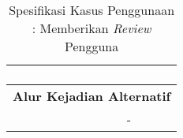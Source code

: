\begin{table}[H]
\begin{tabular}{|r|p{8cm}|}
\begin{enumerate}
			\end{enumerate}
			\\ \hline
			\multicolumn{2}{|c|}{\textbf{Alur Kejadian Alternatif}} \\ \hline
			\multicolumn{1}{|l|}{}                                   \pagebreak        
			& -
			\\ \hline
		\end{tabular}
		\caption{Spesifikasi Kasus Penggunaan : Memberikan \textit{Review} Pengguna}
		\label{uc04.02}
	\end{table}